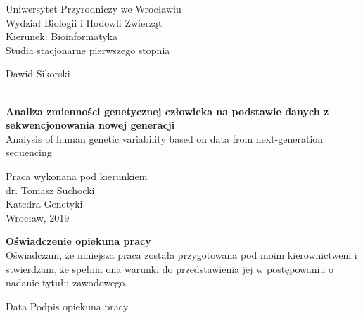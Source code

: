 \documentclass[12pt]{article}
\begin{document}
\centering
{\fontsize{20}{20}\selectfont Uniwersytet Przyrodniczy we Wrocławiu}\\
{\fontsize{18}{18}\selectfont Wydział Biologii i Hodowli Zwierząt}\\
{\fontsize{16}{16}\selectfont Kierunek: Bioinformatyka}\\
{\fontsize{16}{16}\selectfont Studia stacjonarne pierwszego stopnia}\\

\vspace{3cm}

{\fontsize{20}{20}\selectfont Dawid Sikorski}\\
{\fontsize{14}{14}}\\

\vspace{2.5cm}

\textbf{\fontsize{24}{24}\selectfont Analiza zmienności genetycznej człowieka na podstawie danych z sekwencjonowania nowej generacji}\\
{\fontsize{18}{18}\selectfont Analysis of human genetic variability based on data from next-generation sequencing}\\

\vspace{3cm}

\flushright
{\fontsize{14}{14}\selectfont Praca wykonana pod kierunkiem}\\
{\fontsize{14}{14}\selectfont dr. Tomasz Suchocki}\\
{\fontsize{14}{14}\selectfont Katedra Genetyki}\\

\vspace{2cm}
\centering
{\fontsize{14}{14}\selectfont Wrocław, 2019}\\  

\newpage
 


\flushleft
\vspace{10cm} 
\textbf{\fontsize{14}{14}\selectfont Oświadczenie opiekuna pracy} \\
Oświadczam, że niniejsza praca została przygotowana pod moim kierownictwem i stwierdzam, że spełnia ona warunki do przedstawienia jej w postępowaniu o nadanie tytułu zawodowego.

\vspace{3cm}

Data\hspace{10cm} Podpis opiekuna pracy

\vspace{7cm} 
\end{document}
